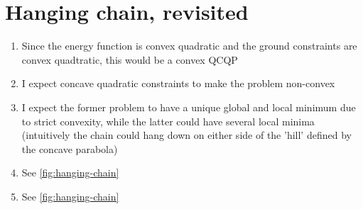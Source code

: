 \documentclass[oneside, a4paper]{book}
\begin{document}
\section{Hanging chain, revisited}
\begin{enumerate}
  \item Since the energy function is convex quadratic and the ground constraints are convex quadtratic, this would be a convex QCQP
  \item I expect concave quadratic constraints to make the problem non-convex
  \item I expect the former problem to have a unique global and local minimum due to strict convexity, while the latter could have several local minima (intuitively the chain could hang down on either side of the 'hill' defined by the concave parabola)  
  \item See \autoref{fig:hanging-chain}
  \item See \autoref{fig:hanging-chain}
\end{enumerate}
\end{document}
